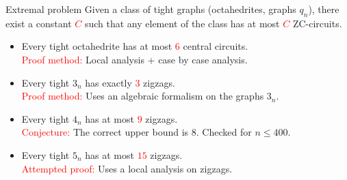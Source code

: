 \documentclass[%
pdf,
colorBG,
slideColor,
]{prosper}
\begin{document}
\begin{slide}{Extremal problem}
Given a class of tight graphs (octahedrites, graphs $q_n$), there exist a constant \textcolor{red}{$C$} such that any element of the class has at most \textcolor{red}{$C$} ZC-circuits.

\begin{itemize}
\item Every tight octahedrite has at most \textcolor{red}{$6$} central circuits.\\
\textcolor{red}{Proof method:} Local analysis + case by case analysis.
\item Every tight $3_n$ has exactly \textcolor{red}{$3$} zigzags.\\
\textcolor{red}{Proof method:} Uses an algebraic formalism on the graphs $3_n$.
\item Every tight $4_n$ has at most \textcolor{red}{$9$} zigzags.\\
\textcolor{red}{Conjecture:} The correct upper bound is $8$. Checked for $n\leq 400$.
\item Every tight $5_n$ has at most \textcolor{red}{$15$} zigzags.\\
\textcolor{red}{Attempted proof:} Uses a local analysis on zigzags.

\end{itemize}



\end{slide}
\end{document}
